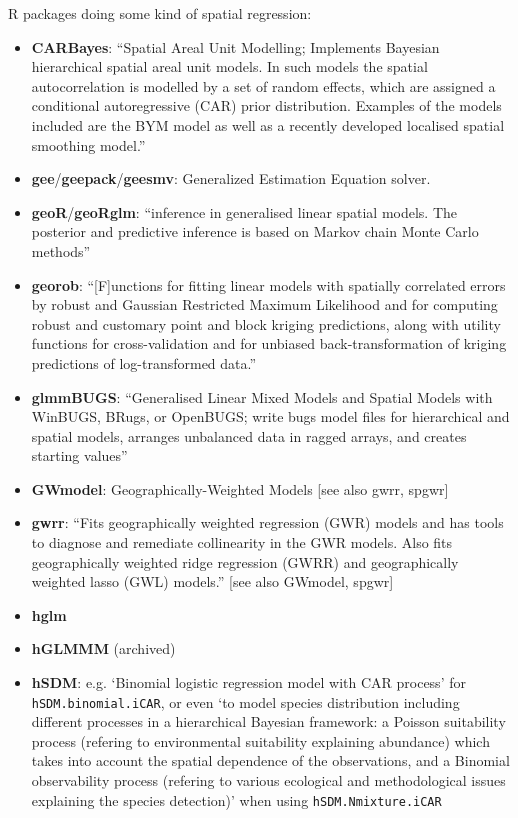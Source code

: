 \documentclass[11pt]{article}
\begin{document}
\noindent R packages doing some kind of spatial regression:
\begin{itemize}
\item \textbf{CARBayes}: ``Spatial Areal Unit Modelling; Implements Bayesian hierarchical spatial areal unit models. In such models the spatial autocorrelation is modelled by a set of random effects, which are assigned a conditional autoregressive (CAR) prior distribution. Examples of the models included are the BYM model as well as a recently developed localised spatial smoothing model.''
\item \textbf{gee}/\textbf{geepack}/\textbf{geesmv}: Generalized Estimation Equation solver.
\item \textbf{geoR}/\textbf{geoRglm}: ``inference in generalised linear spatial models. The posterior and predictive inference is based on Markov chain Monte Carlo methods''
\item \textbf{georob}: ``[F]unctions for fitting linear models with spatially correlated errors by robust and Gaussian Restricted Maximum Likelihood and for computing robust and customary point and block kriging predictions, along with utility functions for cross-validation and for unbiased back-transformation of kriging predictions of log-transformed data.''
\item \textbf{glmmBUGS}: ``Generalised Linear Mixed Models and Spatial Models with WinBUGS, BRugs, or OpenBUGS; write bugs model files for hierarchical and spatial models, arranges unbalanced data in ragged arrays, and creates starting values''
\item \textbf{GWmodel}: Geographically-Weighted Models [see also gwrr, spgwr]
\item \textbf{gwrr}: ``Fits geographically weighted regression (GWR) models and has tools to diagnose and remediate collinearity in the GWR models. Also fits geographically weighted ridge regression (GWRR) and geographically weighted lasso (GWL) models.'' [see also GWmodel, spgwr]
\item \textbf{hglm}
\item \textbf{hGLMMM} (archived)
\item \textbf{hSDM}: e.g. `Binomial logistic regression model with CAR process' for \texttt{hSDM.binomial.iCAR}, or even `to model species distribution including different processes in a hierarchical Bayesian framework: a Poisson suitability process (refering to environmental suitability explaining abundance) which takes into account the spatial dependence of the observations, and a Binomial observability process (refering to various ecological and methodological issues explaining the species detection)' when using \texttt{hSDM.Nmixture.iCAR}

\end{itemize}
\end{document}
